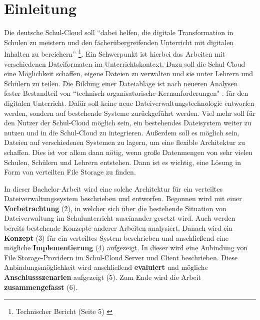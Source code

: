 \section{Einleitung}
\label{sec:intro}

Die deutsche Schul-Cloud soll ``dabei helfen, die digitale Transformation in Schulen zu meistern und den fächerübergreifenden Unterricht mit digitalen Inhalten zu bereichern'' \footnote{ Technischer Bericht (Seite 5) \cite{paper:technischerbericht}}. Ein Schwerpunkt ist hierbei das Arbeiten mit verschiedenen Dateiformaten im Unterrichtskontext. Dazu soll die Schul-Cloud eine Möglichkeit schaffen, eigene Dateien zu verwalten und sie unter Lehrern und Schülern zu teilen. Die Bildung einer Dateiablage ist nach neueren Analysen fester Bestandteil von ``technisch-organisatorische Kernanforderungen" \cite{paper:breiterstolpmannzeising2015}. für den digitalen Unterricht. Dafür soll keine neue Dateiverwaltungstechnologie entworfen werden, sondern auf bestehende Systeme zurückgeführt werden. Viel mehr soll für den Nutzer der Schul-Cloud möglich sein, ein bestehendes Dateisystem weiter zu nutzen und in die Schul-Cloud zu integrieren. Außerdem soll es möglich sein, Dateien auf verschiedenen Systemen zu lagern, um eine flexible Architektur zu schaffen. Dies ist vor allem dann nötig, wenn große Datenmengen von sehr vielen Schulen, Schülern und Lehrern entstehen. Dann ist es wichtig, eine Lösung in Form von verteilten File Storage zu finden. 

In dieser Bachelor-Arbeit wird eine solche Architektur für ein verteiltes Dateiverwaltungssystem beschrieben und entworfen. Begonnen wird mit einer \textbf{Vorbetrachtung} (2), in welcher sich über die bestehende Situation von Dateiverwaltung im Schulunterricht auseinander gesetzt wird. Auch werden bereits bestehende Konzepte anderer Arbeiten analysiert. Danach wird ein \textbf{Konzept} (3) für ein verteiltes System beschrieben und anschließend eine mögliche \textbf{Implementierung} (4)  aufgezeigt. In dieser wird eine Anbindung von File Storage-Providern im Schul-Cloud Server und Client beschrieben. Diese Anbindungsmöglichkeit wird anschließend \textbf{evaluiert} und mögliche \textbf{Anschlussszenarien} aufgezeigt (5). Zum Ende wird die Arbeit \textbf{zusammengefasst} (6).

\clearpage
